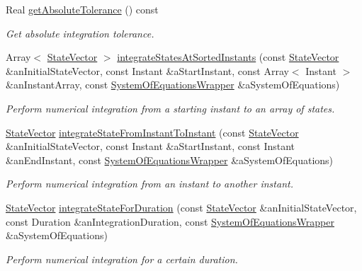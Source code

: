 \begin{DoxyCompactItemize}
Real \hyperlink{classostk_1_1astro_1_1_numerical_solver_a0f768255c5f2f51f395e4515db245930}{get\+Absolute\+Tolerance} () const
\begin{DoxyCompactList}\small\item\em Get absolute integration tolerance. \end{DoxyCompactList}\item 
Array$<$ \hyperlink{classostk_1_1astro_1_1_numerical_solver_a4a1673a6f74a72d6bacfe6480b9c1ccd}{State\+Vector} $>$ \hyperlink{classostk_1_1astro_1_1_numerical_solver_a87bd6b5ab330b5dcfa98ce8e2e18470c}{integrate\+States\+At\+Sorted\+Instants} (const \hyperlink{classostk_1_1astro_1_1_numerical_solver_a4a1673a6f74a72d6bacfe6480b9c1ccd}{State\+Vector} \&an\+Initial\+State\+Vector, const Instant \&a\+Start\+Instant, const Array$<$ Instant $>$ \&an\+Instant\+Array, const \hyperlink{classostk_1_1astro_1_1_numerical_solver_aa39593aa5ff747e4f68492708b45bbc5}{System\+Of\+Equations\+Wrapper} \&a\+System\+Of\+Equations)
\begin{DoxyCompactList}\small\item\em Perform numerical integration from a starting instant to an array of states. \end{DoxyCompactList}\item 
\hyperlink{classostk_1_1astro_1_1_numerical_solver_a4a1673a6f74a72d6bacfe6480b9c1ccd}{State\+Vector} \hyperlink{classostk_1_1astro_1_1_numerical_solver_a1b70e0e1a28d5c68f4dbde0b972e57e0}{integrate\+State\+From\+Instant\+To\+Instant} (const \hyperlink{classostk_1_1astro_1_1_numerical_solver_a4a1673a6f74a72d6bacfe6480b9c1ccd}{State\+Vector} \&an\+Initial\+State\+Vector, const Instant \&a\+Start\+Instant, const Instant \&an\+End\+Instant, const \hyperlink{classostk_1_1astro_1_1_numerical_solver_aa39593aa5ff747e4f68492708b45bbc5}{System\+Of\+Equations\+Wrapper} \&a\+System\+Of\+Equations)
\begin{DoxyCompactList}\small\item\em Perform numerical integration from an instant to another instant. \end{DoxyCompactList}\item 
\hyperlink{classostk_1_1astro_1_1_numerical_solver_a4a1673a6f74a72d6bacfe6480b9c1ccd}{State\+Vector} \hyperlink{classostk_1_1astro_1_1_numerical_solver_a759c48ef757547a6855c21795c66ec5a}{integrate\+State\+For\+Duration} (const \hyperlink{classostk_1_1astro_1_1_numerical_solver_a4a1673a6f74a72d6bacfe6480b9c1ccd}{State\+Vector} \&an\+Initial\+State\+Vector, const Duration \&an\+Integration\+Duration, const \hyperlink{classostk_1_1astro_1_1_numerical_solver_aa39593aa5ff747e4f68492708b45bbc5}{System\+Of\+Equations\+Wrapper} \&a\+System\+Of\+Equations)
\begin{DoxyCompactList}\small\item\em Perform numerical integration for a certain duration. \end{DoxyCompactList}\end{DoxyCompactItemize}
